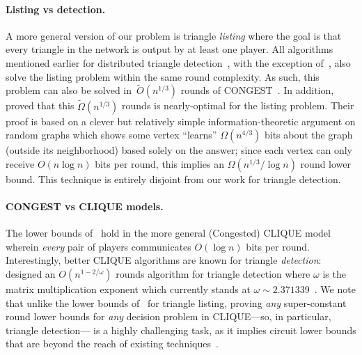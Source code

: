 \documentclass[11pt]{article}
\theoremstyle{definition}
\newcommand{\Ot}{\ensuremath{\widetilde{O}}}
\begin{document}
\paragraph{Listing vs detection.} A more general version of our problem is triangle \emph{listing} where the goal is that every triangle in the network is output by at least one player. 
All algorithms mentioned earlier for distributed triangle detection~\cite{IzumiG17,ChangPZ19,ChangS19,ChangS20,CHLV22,ChangHS24}, with the exception of~\cite{IzumiG17}, 
also solve the listing problem within the same round complexity. As such, this problem can also be solved in~$\Ot(n^{1/3})$ rounds of CONGEST~\cite{ChangS19,ChangHS24}. 
In addition,~\cite{IzumiG17,PanduranganRS18} proved that this $\widetilde{\Omega}(n^{1/3})$ rounds is nearly-optimal for the listing problem. 
Their proof is based on a clever but relatively simple information-theoretic argument on random graphs which shows some vertex ``learns'' $\Omega(n^{4/3})$ bits
about the graph (outside its neighborhood) based solely on the answer; since each vertex 
can only receive $O(n\log{n})$ bits per round, this implies an $\Omega(n^{1/3}/\log{n})$ round lower bound. 
This technique is entirely disjoint from our work for triangle detection. 


\paragraph{CONGEST vs CLIQUE models.} The lower bounds of~\cite{IzumiG17,PanduranganRS18} hold in the more general (Congested) CLIQUE model~\cite{LotkerPPP05} 
wherein \emph{every} pair of players communicates $O(\log{n})$ bits per round. 
Interestingly, better CLIQUE algorithms are known for triangle \emph{detection}:~\cite{CensorHillelKK15} 
designed an $O(n^{1-2/\omega})$ rounds algorithm for triangle detection where $\omega$ is the matrix multiplication exponent %
which currently stands at $\omega \sim 2.371339$~\cite{AlmanDWXXZ25}. 
We note that unlike the lower bounds of~\cite{IzumiG17,PanduranganRS18} for triangle listing, proving \emph{any} super-constant round lower bounds for \emph{any} decision problem in CLIQUE---so, in particular, triangle detection---%
is a highly challenging task, as it implies circuit lower bounds that are beyond the reach of existing techniques~\cite{DruckerKO14}. 
\end{document}
